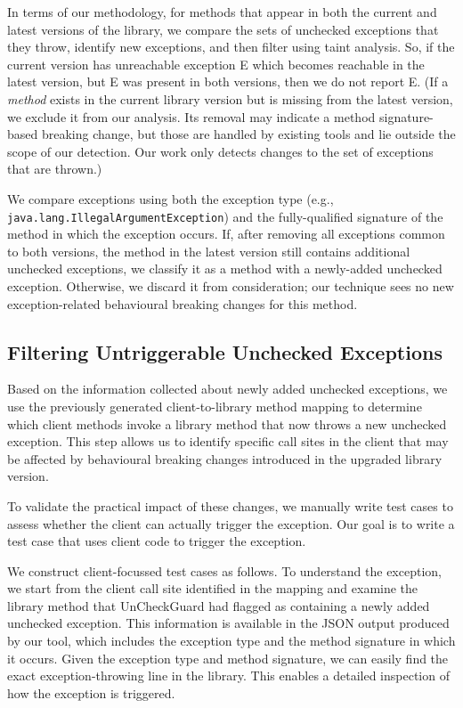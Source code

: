 
In terms of our methodology, for methods that appear in both the current and latest versions of the library, we compare the sets of unchecked exceptions that they throw, identify new exceptions, and then filter using taint analysis. So, if the current version has unreachable exception E which becomes reachable in the latest version, but E was present in both versions, then we do not report E. (If a \emph{method} exists in the current library version but is missing from the latest version, we exclude it from our analysis. Its removal may indicate a method signature-based breaking change, but those are handled by existing tools and lie outside the scope of our detection. Our work only detects changes to the set of exceptions that are thrown.)

We compare exceptions using both the exception type (e.g., \texttt{java.lang.IllegalArgumentException}) and the fully-qualified signature of the method in which the exception occurs. If, after removing all exceptions common to both versions, the method in the latest version still contains additional unchecked exceptions, we classify it as a method with a newly-added unchecked exception. Otherwise, we discard it from consideration; our technique sees no new exception-related behavioural breaking changes for this method.

\subsection{Filtering Untriggerable Unchecked Exceptions}

Based on the information collected about newly added unchecked exceptions, we use the previously generated client-to-library method mapping to determine which client methods invoke a library method that now throws a new unchecked exception. This step allows us to identify specific call sites in the client that may be affected by behavioural breaking changes introduced in the upgraded library version.

To validate the practical impact of these changes, we manually write test cases to assess whether the client can actually trigger the exception. Our goal is to write a test case that uses client code to trigger the exception.

We construct client-focussed test cases as follows. To understand the exception, we start from the client call site identified in the mapping and examine the library method that UnCheckGuard had flagged as containing a newly added unchecked exception. This information is available in the JSON output produced by our tool, which includes the exception type and the method signature in which it occurs. Given the exception type and method signature, we can easily find the exact exception-throwing line in the library. This enables a detailed inspection of how the exception is triggered.

